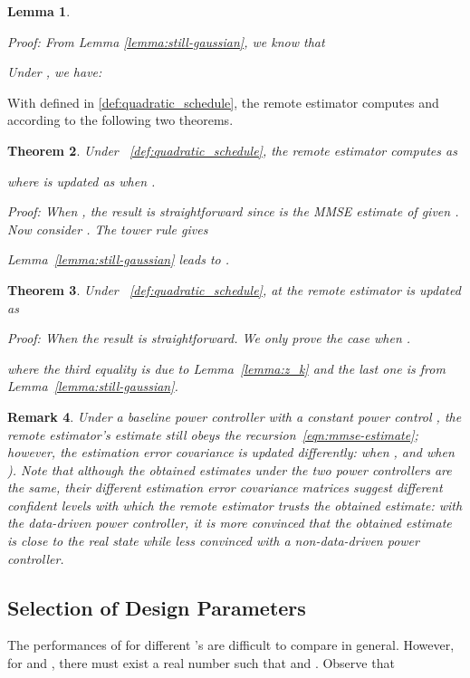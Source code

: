 \documentclass[twocolumn]{autart}    \usepackage{cite}
\newtheorem{theorem}{Theorem}[section]
\newtheorem{lemma}[theorem]{Lemma}
\newtheorem{remark}[theorem]{Remark}
\begin{document}
{{\begin{lemma}
\begin{pf*}{Proof:}
From Lemma \ref{lemma:still-gaussian}, we know that

Under , we have:

\end{pf*}
\end{lemma}
With  defined in \eqref{def:quadratic_schedule}, the remote estimator computes  and  according to the following two theorems.
\begin{theorem}\label{theorem:mmse-proof}
Under ~\eqref{def:quadratic_schedule},
the remote estimator computes  as

where  is updated as  when .
\begin{pf*}{Proof:}
    When , the result is straightforward
    since  is the MMSE estimate of  given
     . Now consider . The tower rule gives
    
    Lemma~\ref{lemma:still-gaussian} leads to
    .
    \end{pf*}
\end{theorem}
\begin{theorem} \label{theorem:form_P_k_on}
Under ~\eqref{def:quadratic_schedule},
 at
the remote estimator is updated as

\begin{pf*}{Proof:}
    When  the result is straightforward.
    We only prove the case when .
    
    where the third equality is due to
    Lemma~\ref{lemma:z_k} and the last one
    is from Lemma~\ref{lemma:still-gaussian}.
\end{pf*}
\end{theorem}
\begin{remark}
{Under a baseline power controller with a constant power control , the remote estimator's estimate still obeys the recursion~\eqref{eqn:mmse-estimate}; however, the estimation error covariance is updated differently:  when , and  when ). Note that although the obtained estimates under the two power controllers are the same, their different estimation error covariance matrices suggest different confident levels with which the remote estimator trusts the obtained estimate: with the data-driven power controller, it is more convinced that the obtained estimate is close to the real state while less convinced with a non-data-driven power controller.}
\end{remark}
\subsection{{Selection of Design Parameters}}
\label{subsec:opt-bayesian-reference-schedule}
The performances of  for different
's are difficult to compare in general.
However, for  and
, there must exist a
real number 
such that  and
.
Observe that

}}
\end{document}
